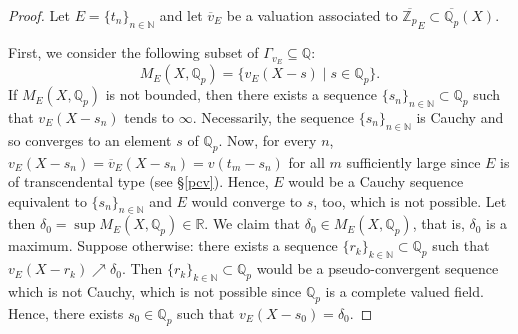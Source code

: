 \documentclass[10pt]{article}
\numberwithin{equation}{section}
\theoremstyle{definition}\newtheorem{Def}[equation]{Definition}
\theoremstyle{definition}\newtheorem{Ques}[equation]{Question}
\newcommand{\Q}{\mathbb{Q}}
\newcommand{\N}{\mathbb{N}}
\newcommand{\Z}{\mathbb{Z}}
\newcommand{\R}{\mathbb{R}}
\newcommand{\oQp}{\overline{\Q_p}}
\newcommand{\oZp}{\overline{\Z_p}}
\newcommand\rc { \color{red}}
\begin{document}
\begin{proof}
Let $E=\{t_n\}_{n\in\N}$ and let $\overline v_E$ be a valuation associated to $\oZp_{E}\subset\oQp(X)$. 

First, we consider the following subset of $\Gamma_{v_E}\subseteq\Q$:
$$M_E(X,\Q_p)=\{v_E(X-s)\mid s\in\Q_p\}.$$
If $M_E(X,\Q_p)$ is not bounded, then there exists a sequence $\{s_n\}_{n\in\N}\subset\Q_p$ such that $v_E(X-s_n)$ tends to $\infty$. Necessarily, the sequence $\{s_n\}_{n\in\N}$ is  Cauchy and so converges to an element $s$ of $\Q_p$. Now, for every $n$, $v_E(X-s_n)=\overline v_E(X-s_n)=v(t_m-s_n)$ for all $m$ sufficiently large since $E$ is of transcendental type (see \S \ref{pcv}). Hence, $E$ would be a Cauchy sequence equivalent to $\{s_n\}_{n\in\N}$ and $E$ would converge to $s$, too, which is not possible. Let then $\delta_0=\sup M_E(X,\Q_p)\in\R$. We claim that $\delta_0\in M_E(X,\Q_p)$, that is, $\delta_0$ is a maximum. Suppose otherwise: there exists a sequence $\{r_k\}_{k\in\N}\subset\Q_p$ such that $v_E(X-r_k)\nearrow\delta_0$. Then $\{r_k\}_{k\in\N}\subset\Q_p$ would be a pseudo-convergent sequence which is not Cauchy, which is not possible since $\Q_p$ is a complete valued field. Hence, there exists $s_0\in\Q_p$ such that $v_E(X-s_0)=\delta_0$. 



\end{proof}
\end{document}
